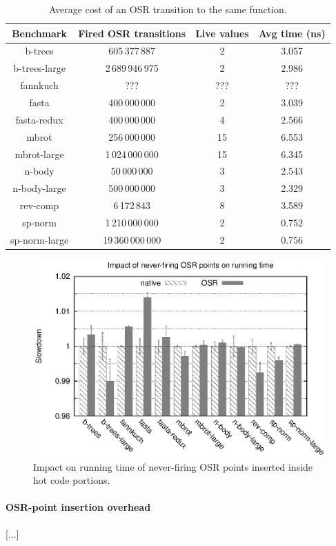 \begin{table} 
\begin{footnotesize}
    \begin{tabular}{ |c|c|c|c| }
        \hline
        Benchmark & Fired OSR transitions & Live values & Avg time (ns) \\ 
        \hline
        \hline
        b-trees & 605\,377\,887 & 2 & 3.057 \\ 
        \hline
        b-trees-large & 2\,689\,946\,975 & 2 & 2.986 \\ 
        \hline
        fannkuch & ??? & ??? & ??? \\ 
        \hline
        fasta & 400\,000\,000 & 2 & 3.039 \\ 
        \hline
        fasta-redux & 400\,000\,000 & 4 & 2.566 \\ 
        \hline
        mbrot & 256\,000\,000 & 15 & 6.553 \\ 
        \hline
        mbrot-large & 1\,024\,000\,000 & 15 & 6.345 \\ 
        \hline
        n-body & 50\,000\,000 & 3 & 2.543 \\ 
        \hline
        n-body-large & 500\,000\,000 & 3 & 2.329 \\ 
        \hline
        rev-comp & 6\,172\,843 & 8 & 3.589 \\ 
        \hline
        sp-norm & 1\,210\,000\,000 & 2 & 0.752 \\ 
        \hline
        sp-norm-large & 19\,360\,000\,000 & 2 & 0.756 \\
        \hline
    \end{tabular} 
    \end{footnotesize}
    \caption{\label{tab:sameFun}Average cost of an OSR transition to the same function.} 
\end{table}

\ifdefined\noauthorea
\begin{figure}[t]
\begin{center}
\includegraphics[width=0.7\columnwidth]{figures/code-quality-noBB/code-quality-noBB.eps}
\caption{\label{fig:code-quality} Impact on running time of never-firing OSR points inserted inside hot code portions.}
\end{center}
\end{figure}
\fi

\paragraph{OSR-point insertion overhead}
[...]
  

  
  
  
  
  
  
  
  
  
  